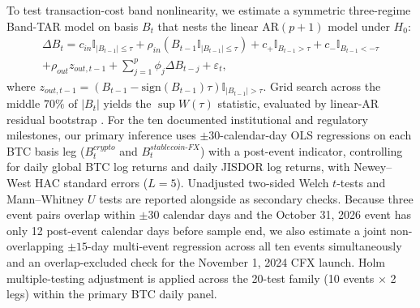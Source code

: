 To test transaction-cost band nonlinearity, we estimate a symmetric three-regime Band-TAR model on basis $B_t$ that nests the linear $\mathrm{AR}(p+1)$ model under $H_0$:
\begin{multline}
  \Delta B_t = c_{in}\mathbb{I}_{|B_{t-1}|\le\tau} + \rho_{in}(B_{t-1}\mathbb{I}_{|B_{t-1}|\le\tau}) + c_+\mathbb{I}_{B_{t-1}>\tau} + c_-\mathbb{I}_{B_{t-1}<-\tau} \\
  + \rho_{out}z_{out,t-1} + \sum_{j=1}^{p}\phi_j\Delta B_{t-j} + \varepsilon_t,
  \label{eq:tar}
\end{multline}
where $z_{out,t-1} = (B_{t-1} - \mathrm{sign}(B_{t-1})\tau)\mathbb{I}_{|B_{t-1}|>\tau}$. Grid search across the middle $70\%$ of $|B_t|$ yields the $\sup W(\tau)$ statistic, evaluated by linear-AR residual bootstrap \citep{hansen2002testing}. For the ten documented institutional and regulatory milestones, our primary inference uses $\pm 30$-calendar-day OLS regressions on each BTC basis leg ($B_t^{crypto}$ and $B_t^{stablecoin\text{-}FX}$) with a post-event indicator, controlling for daily global BTC log returns and daily JISDOR log returns, with Newey--West HAC standard errors ($L=5$). Unadjusted two-sided Welch $t$-tests and Mann--Whitney $U$ tests are reported alongside as secondary checks. Because three event pairs overlap within $\pm 30$ calendar days and the October 31, 2026 event has only 12 post-event calendar days before sample end, we also estimate a joint non-overlapping $\pm 15$-day multi-event regression across all ten events simultaneously and an overlap-excluded check for the November 1, 2024 CFX launch. Holm multiple-testing adjustment is applied across the 20-test family (10 events $\times$ 2 legs) within the primary BTC daily panel.
